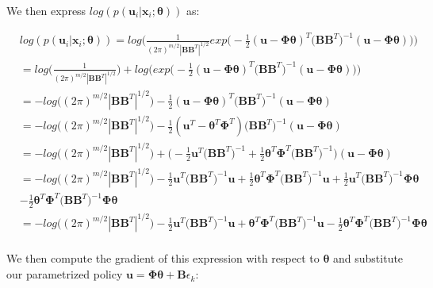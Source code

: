 \documentclass[11pt]{homework}
\renewcommand{\vec}[1]{\ensuremath{\boldsymbol{#1}}}
\begin{document}
\begin{arabicparts}
	We then express $log(p(\vec{u}_{i}|\vec{x}_{i};\vec{\theta}))$ as: 
	
	\begin{align*}
		&  log(p(\vec{u}_{i}|\vec{x}_{i};\vec{\theta})) = log\Bigg(  \frac{1}{(2\pi)^{m/2}| \vec{B}\vec{B}^{T}|^{1/2}}exp\Big( -\frac{1}{2}(\vec{u} - \vec{\Phi}\vec{\theta})^{T}\Big(\vec{B}\vec{B}^T\Big)^{-1}(\vec{u}-\vec{\Phi}\vec{\theta})  \Big)    \Bigg) \\
		& = log\Bigg( \frac{1}{(2\pi)^{m/2}| \vec{B}\vec{B}^{T}|^{1/2}} \Bigg) + log\Bigg( exp\Big( -\frac{1}{2}(\vec{u} - \vec{\Phi}\vec{\theta})^{T}\Big(\vec{B}\vec{B}^T\Big)^{-1}(\vec{u}-\vec{\Phi}\vec{\theta})  \Big)  \Bigg)\\
		& = -log\Big( (2\pi)^{m/2} |\vec{B}\vec{B}^{T}|^{1/2} \Big) - \frac{1}{2}(\vec{u} - \vec{\Phi}\vec{\theta})^{T}\Big(\vec{B}\vec{B}^T\Big)^{-1}(\vec{u}-\vec{\Phi}\vec{\theta}) \\
		& = -log\Big( (2\pi)^{m/2} |\vec{B}\vec{B}^{T}|^{1/2} \Big) - \frac{1}{2}(\vec{u}^{T} -\vec{\theta}^{T} \vec{\Phi}^{T})\Big(\vec{B}\vec{B}^T\Big)^{-1}(\vec{u}-\vec{\Phi}\vec{\theta}) \\
		& = -log\Big( (2\pi)^{m/2}|\vec{B}\vec{B}^{T}|^{1/2} \Big) + \Bigg(-\frac{1}{2}\vec{u}^{T}\Big(\vec{B}\vec{B}^T\Big)^{-1}  + \frac{1}{2}\vec{\theta}^{T}\vec{\Phi}^{T}\Big(\vec{B}\vec{B}^T\Big)^{-1}\Bigg)(\vec{u}-\vec{\Phi}\vec{\theta}) \\
		& = -log\Big( (2\pi)^{m/2}|\vec{B}\vec{B}^{T}|^{1/2} \Big)  -\frac{1}{2}\vec{u}^{T}\Big(\vec{B}\vec{B}^T\Big)^{-1}\vec{u}	+ \frac{1}{2}\vec{\theta}^{T}\vec{\Phi}^{T}\Big(\vec{B}\vec{B}^T\Big)^{-1}\vec{u} + \frac{1}{2}\vec{u}^{T}\Big(\vec{B}\vec{B}^T\Big)^{-1}\vec{\Phi}\vec{\theta} \\
		& - \frac{1}{2}\vec{\theta}^{T}\vec{\Phi}^{T}\Big(\vec{B}\vec{B}^T\Big)^{-1}\vec{\Phi}\vec{\theta} \\
		& = -log\Big( (2\pi)^{m/2}|\vec{B}\vec{B}^{T}|^{1/2} \Big)  -\frac{1}{2}\vec{u}^{T}\Big(\vec{B}\vec{B}^T\Big)^{-1}\vec{u} + \vec{\theta}^{T}\vec{\Phi}^{T}\Big(\vec{B}\vec{B}^T\Big)^{-1}\vec{u} - \frac{1}{2}\vec{\theta}^{T}\vec{\Phi}^{T}\Big(\vec{B}\vec{B}^T\Big)^{-1}\vec{\Phi}\vec{\theta} \\
	\end{align*}
	
	We then compute the gradient of this expression with respect to $\vec{\theta}$ and substitute our parametrized policy $\vec{u} = \vec{\Phi}\vec{\theta} + \vec{B}\epsilon_{k}$:
	

\end{arabicparts}
\end{document}
